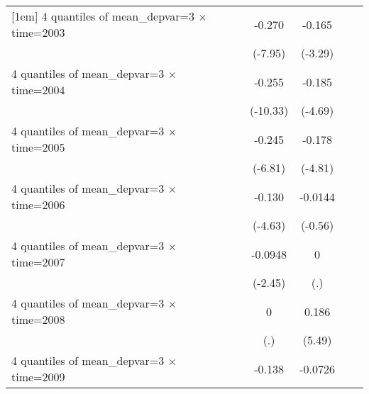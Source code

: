 \begin{table}[htbp]
\begin{tabular}{l*{6}{c}}
[1em]
4 quantiles of mean\_depvar=3 $\times$ time=2003&                     &                     &      -0.270\sym{***}&      -0.165\sym{***}&                     &                     \\
                    &                     &                     &     (-7.95)         &     (-3.29)         &                     &                     \\
[1em]
4 quantiles of mean\_depvar=3 $\times$ time=2004&                     &                     &      -0.255\sym{***}&      -0.185\sym{***}&                     &                     \\
                    &                     &                     &    (-10.33)         &     (-4.69)         &                     &                     \\
[1em]
4 quantiles of mean\_depvar=3 $\times$ time=2005&                     &                     &      -0.245\sym{***}&      -0.178\sym{***}&                     &                     \\
                    &                     &                     &     (-6.81)         &     (-4.81)         &                     &                     \\
[1em]
4 quantiles of mean\_depvar=3 $\times$ time=2006&                     &                     &      -0.130\sym{***}&     -0.0144         &                     &                     \\
                    &                     &                     &     (-4.63)         &     (-0.56)         &                     &                     \\
[1em]
4 quantiles of mean\_depvar=3 $\times$ time=2007&                     &                     &     -0.0948\sym{**} &           0         &                     &                     \\
                    &                     &                     &     (-2.45)         &         (.)         &                     &                     \\
[1em]
4 quantiles of mean\_depvar=3 $\times$ time=2008&                     &                     &           0         &       0.186\sym{***}&                     &                     \\
                    &                     &                     &         (.)         &      (5.49)         &                     &                     \\
[1em]
4 quantiles of mean\_depvar=3 $\times$ time=2009&                     &                     &      -0.138\sym{***}&     -0.0726\sym{**} &                     &                     \\

\end{tabular}
\end{table}
